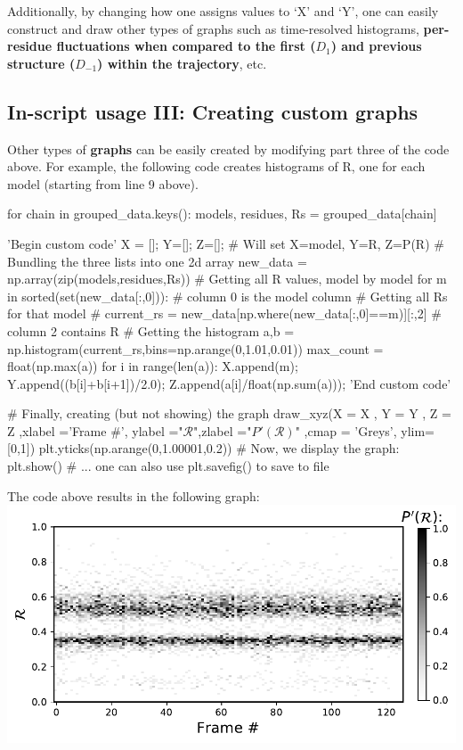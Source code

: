 \documentclass[fleqn,10pt,lineno]{wlpeerj} %
\newcommand{\n}[1]{{\textbf{\color{red}#1}}}
\begin{document}
\begin{enumerate}
Additionally, by changing how one assigns values to `X' and `Y', 
one can easily construct and draw other types of graphs such as time-resolved histograms, 
\n{per-residue fluctuations when compared to the first ($D_{1}$) and previous structure ($D_{-1}$) within the trajectory}, etc. 
\end{enumerate}

\subsection*{In-script usage III: Creating custom graphs}
Other types of \n{graphs} can be easily created by modifying part three of the code above. 
For example, the following code creates histograms of R, one for each model (starting from line 9 above).
\begin{python}[firstnumber=9]
	for chain in grouped_data.keys():
		models, residues, Rs = grouped_data[chain]
		
		'Begin custom code'
		X = []; Y=[]; Z=[]; # Will set X=model, Y=R, Z=P(R)
		# Bundling the three lists into one 2d array
		new_data =  np.array(zip(models,residues,Rs))
		# Getting all R values, model by model
		for m in sorted(set(new_data[:,0])): # column 0 is the model column
			# Getting all Rs for that model #
			current_rs = new_data[np.where(new_data[:,0]==m)][:,2] # column 2 contains R
			# Getting the histogram
			a,b = np.histogram(current_rs,bins=np.arange(0,1.01,0.01))
			max_count = float(np.max(a))
			for i in range(len(a)):
				X.append(m); Y.append((b[i]+b[i+1])/2.0); Z.append(a[i]/float(np.sum(a)));
		'End custom code'
		
		# Finally, creating (but not showing) the graph 
		draw_xyz(X = X       ,      Y = Y  ,                Z = Z
		   ,xlabel ='Frame #', ylabel ="$\mathcal{R}$",zlabel ="$P'(\mathcal{R})$"
			 ,cmap = 'Greys', ylim=[0,1])
		plt.yticks(np.arange(0,1.00001,0.2))
		# Now, we display the graph:
		plt.show() # ... one can also use plt.savefig() to save to file
\end{python}
The code above results in the following graph:\\
\includegraphics[width=0.5\linewidth]{automated_figures/example2.pdf}
\end{document}
